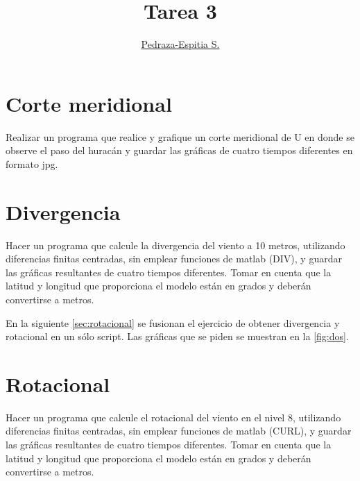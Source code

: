 \documentclass{article}
\title{Tarea 3}
\author{\href{https://git.io/salvador}{Pedraza-Espitia S.}}
\date{}
\begin{document}
\maketitle

\section{Corte meridional}
Realizar un programa que realice y grafique un corte meridional de U en donde se observe el
paso del huracán y guardar las gráficas de cuatro tiempos diferentes en formato jpg.





\section{Divergencia}
Hacer un programa que calcule la divergencia del viento a 10 metros, utilizando diferencias
finitas centradas, sin emplear funciones de matlab (DIV), y guardar las gráficas resultantes de
cuatro tiempos diferentes. Tomar en cuenta que la latitud y longitud que proporciona el
modelo están en grados y deberán convertirse a metros.

En la siguiente \autoref{sec:rotacional} se fusionan el ejercicio de obtener
divergencia y rotacional en un s\'olo script.
Las gr\'aficas que se piden se muestran en la \autoref{fig:dos}.


\section{Rotacional}\label{sec:rotacional}
Hacer un programa que calcule el rotacional del viento en el nivel 8, utilizando diferencias
finitas centradas, sin emplear funciones de matlab (CURL), y guardar las gráficas resultantes
de cuatro tiempos diferentes. Tomar en cuenta que la latitud y longitud que proporciona el
modelo están en grados y deberán convertirse a metros.


\FloatBarrier
\end{document}
